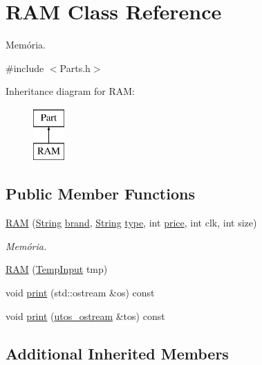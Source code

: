 \hypertarget{class_r_a_m}{}\section{R\+AM Class Reference}
\label{class_r_a_m}


Memória.  




{\ttfamily \#include $<$Parts.\+h$>$}

Inheritance diagram for R\+AM\+:\begin{figure}[H]
\begin{center}
\leavevmode
\includegraphics[height=2.000000cm]{class_r_a_m}
\end{center}
\end{figure}
\subsection*{Public Member Functions}
\begin{DoxyCompactItemize}
\item 
\mbox{\hyperlink{class_r_a_m_a1869d6bd505e7fb58b809270626c82f2}{R\+AM}} (\mbox{\hyperlink{class_string}{String}} \mbox{\hyperlink{class_part_ae06f2fdeb7fbbdb229a7aca151f3e341}{brand}}, \mbox{\hyperlink{class_string}{String}} \mbox{\hyperlink{class_part_a101dbcc5c4b21564df7414c7eb0eae88}{type}}, int \mbox{\hyperlink{class_part_a8e71223aed1da95a974f33d8d6c91bb1}{price}}, int clk, int size)
\begin{DoxyCompactList}\small\item\em Memória. \end{DoxyCompactList}\item 
\mbox{\hyperlink{class_r_a_m_a9c54d554dfa8c3fc9c7c2d87e8dbe28f}{R\+AM}} (\mbox{\hyperlink{struct_temp_input}{Temp\+Input}} tmp)
\item 
void \mbox{\hyperlink{class_r_a_m_a2f226659cbc23f841d73525572ba9574}{print}} (std\+::ostream \&os) const
\item 
void \mbox{\hyperlink{class_r_a_m_a11a874dd6cf99454efd6b7a1d20a3737}{print}} (\mbox{\hyperlink{structutos__ostream}{utos\+\_\+ostream}} \&tos) const
\end{DoxyCompactItemize}
\subsection*{Additional Inherited Members}


